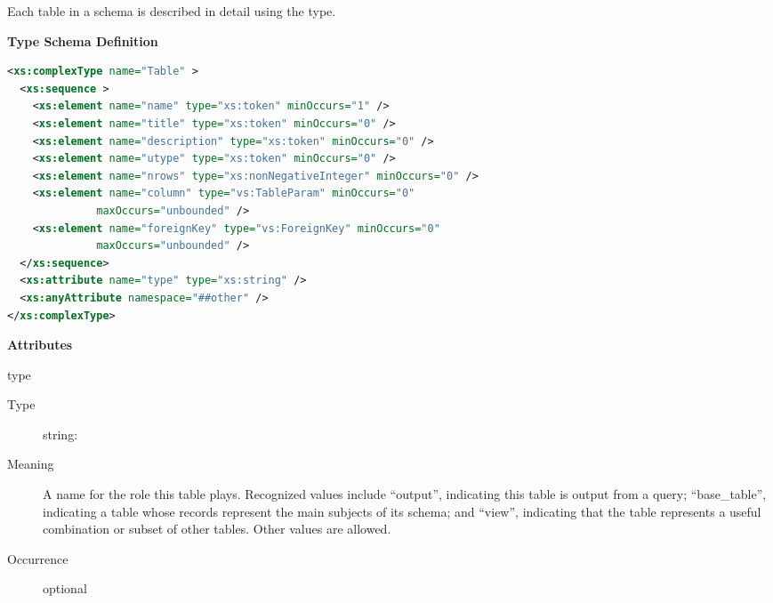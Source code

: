 \documentclass[11pt,a4paper]{ivoa}
\begin{document}


Each table in a schema is described in detail using the
 type.



\begin{generated}
\begingroup
        \renewcommand*\descriptionlabel[1]{%
        \hbox to 5.5em{\emph{#1}\hfil}}\vspace{1ex}\noindent\textbf{ Type Schema Definition}

\begin{lstlisting}[language=XML,basicstyle=\footnotesize]
<xs:complexType name="Table" >
  <xs:sequence >
    <xs:element name="name" type="xs:token" minOccurs="1" />
    <xs:element name="title" type="xs:token" minOccurs="0" />
    <xs:element name="description" type="xs:token" minOccurs="0" />
    <xs:element name="utype" type="xs:token" minOccurs="0" />
    <xs:element name="nrows" type="xs:nonNegativeInteger" minOccurs="0" />
    <xs:element name="column" type="vs:TableParam" minOccurs="0"
              maxOccurs="unbounded" />
    <xs:element name="foreignKey" type="vs:ForeignKey" minOccurs="0"
              maxOccurs="unbounded" />
  </xs:sequence>
  <xs:attribute name="type" type="xs:string" />
  <xs:anyAttribute namespace="##other" />
</xs:complexType>
\end{lstlisting}

\vspace{0.5ex}\noindent\textbf{ Attributes}

\begingroup\small\begin{bigdescription}
\item[type]
\begin{description}
\item[Type] string: 
\item[Meaning]
               A name for the role this table plays.  Recognized
               values include “output”, indicating this table is output
               from a query; “base\_table”, indicating a table
               whose records represent the main subjects of its
               schema; and “view”, indicating that the table represents
               a useful combination or subset of other tables.  Other
               values are allowed.

\item[Occurrence] optional
\end{description}


\end{bigdescription}\endgroup




\end{generated}
\end{document}
